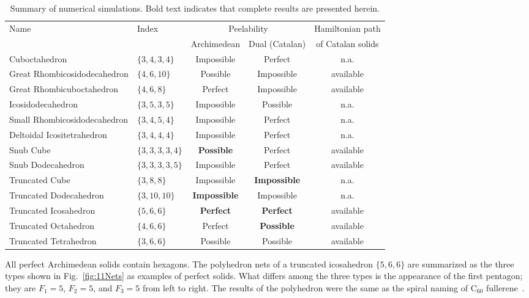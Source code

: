 \documentclass[12pt]{article}
\theoremstyle{plain}
\theoremstyle{definition}
\theoremstyle{remark}
\begin{document}
\begin{table}[ht]
\centering
\caption{Summary of numerical simulations.
  Bold text indicates that complete results are presented herein.}
\label{tab:summary}
\begin{tabular}{llccc}
\toprule
Name & Index
  & \multicolumn{2}{c}{Peelability}
  & Hamiltonian path \\
  & & Archimedean & Dual (Catalan) & of Catalan solids \\
\midrule
Cuboctahedron                 & $\{3,4,3,4\}$   & Impossible & Perfect     & n.a. \\
Great Rhombicosidodecahedron  & $\{4,6,10\}$    & Possible   & Impossible  & available \\
Great Rhombicuboctahedron     & $\{4,6,8\}$     & Perfect    & Impossible  & available \\
Icosidodecahedron             & $\{3,5,3,5\}$   & Impossible & Possible    & n.a. \\
Small Rhombicosidodecahedron  & $\{3,4,5,4\}$   & Impossible & Perfect     & n.a. \\
Deltoidal Icositetrahedron    & $\{3,4,4,4\}$   & Impossible & Perfect     & n.a. \\
Snub Cube                     & $\{3,3,3,3,4\}$ & \textbf{Possible} & Perfect & available \\
Snub Dodecahedron             & $\{3,3,3,3,5\}$ & Impossible & Perfect     & available \\
Truncated Cube                & $\{3,8,8\}$     & Impossible & \textbf{Impossible} & n.a. \\
Truncated Dodecahedron        & $\{3,10,10\}$   & \textbf{Impossible} & Impossible & n.a. \\
Truncated Icosahedron         & $\{5,6,6\}$     & \textbf{Perfect} & \textbf{Perfect} & available \\
Truncated Octahedron          & $\{4,6,6\}$     & Perfect    & \textbf{Possible} & available \\
Truncated Tetrahedron         & $\{3,6,6\}$     & Possible   & Possible    & available \\
\bottomrule
\end{tabular}
\end{table}

All perfect Archimedean solids contain hexagons.
The polyhedron nets of a truncated icosahedron $\{5,6,6\}$ are summarized
as the three types shown in Fig.~\ref{fig:11Nets} as examples of perfect
solids.
What differs among the three types is the appearance of the first
pentagon; they are $F_1=5$, $F_2=5$, and $F_3=5$ from left to right.
The results of the polyhedron were the same as the spiral naming of
$\mathrm{C}_{60}$ fullerene~\cite{Manolopoulos1991}.
\end{document}
